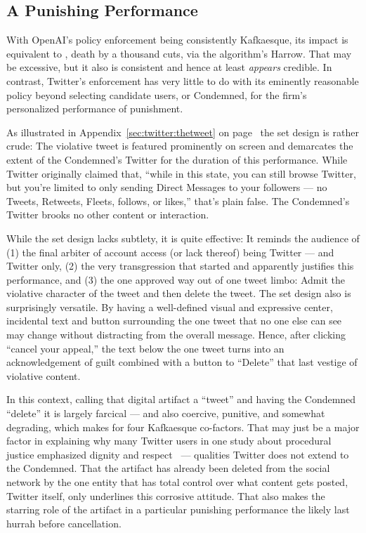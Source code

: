 \subsection{A Punishing Performance}

With OpenAI's policy enforcement being consistently Kafkaesque, its impact is
equivalent to \lingchi, death by a thousand cuts, via the algorithm's Harrow.
That may be excessive, but it also is consistent and hence at least
\emph{appears} credible. In contrast, Twitter's enforcement has very little to
do with its eminently reasonable policy beyond selecting candidate users, or
Condemned, for the firm's personalized performance of punishment.

As illustrated in Appendix~\ref{sec:twitter:thetweet} on
page~\pageref{sec:twitter:thetweet} the set design is rather crude: The
violative tweet is featured prominently on screen and demarcates the extent of
the Condemned's Twitter for the duration of this performance. While Twitter
originally claimed that, ``while in this state, you can still browse Twitter,
but you're limited to only sending Direct Messages to your followers --- no
Tweets, Retweets, Fleets, follows, or likes,'' that's plain false. The
Condemned's Twitter brooks no other content or interaction.

While the set design lacks subtlety, it is quite effective: It reminds the
audience of (1) the final arbiter of account access (or lack thereof) being
Twitter --- and Twitter only, (2) the very transgression that started and
apparently justifies this performance, and (3) the one approved way out of one
tweet limbo: Admit the violative character of the tweet and then delete the
tweet. The set design also is surprisingly versatile. By having a well-defined
visual and expressive center, incidental text and button surrounding the one
tweet that no one else can see may change without distracting from the overall
message. Hence, after clicking ``cancel your appeal,'' the text below the one
tweet turns into an acknowledgement of guilt combined with a button to
``Delete'' that last vestige of violative content.

In this context, calling that digital artifact a ``tweet'' and having the
Condemned ``delete'' it is largely farcical --- and also coercive, punitive, and
somewhat degrading, which makes for four Kafkaesque co-factors. That may just be
a major factor in explaining why many Twitter users in one study about
procedural justice emphasized dignity and respect~\cite{KatsarosTylerea2022} ---
qualities Twitter does not extend to the Condemned. That the artifact has
already been deleted from the social network by the one entity that has total
control over what content gets posted, Twitter itself, only underlines this
corrosive attitude. That also makes the starring role of the artifact in a
particular punishing performance the likely last hurrah before cancellation.

